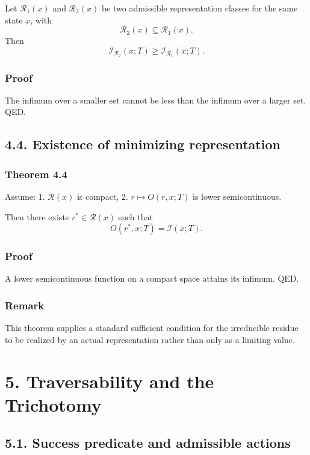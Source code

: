 \documentclass[
]{article}
\begin{document}
Let \(\mathcal{R}_1(x)\) and \(\mathcal{R}_2(x)\) be two admissible
representation classes for the same state \(x\), with \[
\mathcal{R}_2(x) \subseteq \mathcal{R}_1(x).
\] Then \[
\mathcal{I}_{\mathcal{R}_2}(x;T) \ge \mathcal{I}_{\mathcal{R}_1}(x;T).
\]

\subsubsection{Proof}\label{proof-2}

The infimum over a smaller set cannot be less than the infimum over a
larger set. QED.

\subsection{4.4. Existence of minimizing
representation}\label{existence-of-minimizing-representation}

\subsubsection{Theorem 4.4}\label{theorem-4.4}

Assume: 1. \(\mathcal{R}(x)\) is compact, 2. \(r \mapsto O(r,x;T)\) is
lower semicontinuous.

Then there exists \(r^\ast \in \mathcal{R}(x)\) such that \[
O(r^\ast,x;T) = \mathcal{I}(x;T).
\]

\subsubsection{Proof}\label{proof-3}

A lower semicontinuous function on a compact space attains its infimum.
QED.

\subsubsection{Remark}\label{remark}

This theorem supplies a standard sufficient condition for the
irreducible residue to be realized by an actual representation rather
than only as a limiting value.

\section{5. Traversability and the
Trichotomy}\label{traversability-and-the-trichotomy}

\subsection{5.1. Success predicate and admissible
actions}\label{success-predicate-and-admissible-actions}
\end{document}
